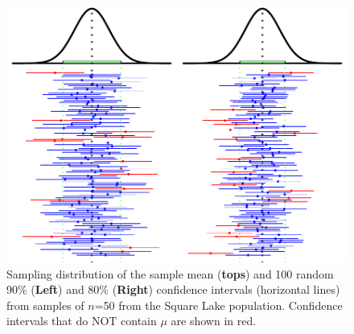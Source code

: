 \documentclass[10pt,openany]{book}\usepackage[]{graphicx}\usepackage[]{color}
\newenvironment{knitrout}{}{} %
\begin{document}
\begin{knitrout}
\color{fgcolor}\begin{figure}[hbtp]

{\centering \includegraphics[width=.95\linewidth]{Figs/CI9080Ex-1} 

}

\caption[Sampling distribution of the sample mean (\textbf{tops}) and 100 random 90\% (\textbf{Left}) and 80\% (\textbf{Right}) confidence intervals (horizontal lines) from samples of $n$=50 from the Square Lake population]{Sampling distribution of the sample mean (\textbf{tops}) and 100 random 90\% (\textbf{Left}) and 80\% (\textbf{Right}) confidence intervals (horizontal lines) from samples of $n$=50 from the Square Lake population.  Confidence intervals that do NOT contain $\mu$ are shown in red.}\label{fig:CI9080Ex}
\end{figure}


\end{knitrout}

\end{document}
